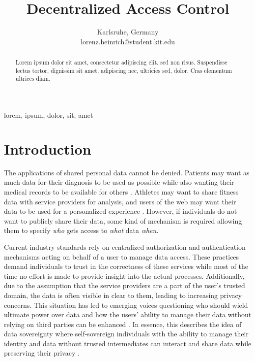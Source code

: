 \documentclass[conference]{IEEEtran}
\begin{document}
\title{Decentralized Access Control}%

\author{
  Karlsruhe, Germany \\
  lorenz.heinrich@student.kit.edu
}

\maketitle

\begin{abstract}
  Lorem ipsum dolor sit amet, consectetur adipiscing elit. sed non risus. Suspendisse lectus tortor, dignissim sit amet, adipiscing nec, ultricies sed, dolor. Cras elementum ultrices diam.
\end{abstract}

\begin{IEEEkeywords}
  lorem, ipsum, dolor, sit, amet
\end{IEEEkeywords}

\section{Introduction}
The applications of shared personal data cannot be denied.
Patients may want as much data for their diagnosis to be used as possible while also wanting their medical records to be available for others \cite{hollis_share_2016}.
Athletes may want to share fitness data with service providers for analysis, and users of the web may want their data to be used for a personalized experience \cite{nasir_council_nodate}.
However, if individuals do not want to publicly share their data, some kind of mechanism is required allowing them to specify \textit{who} gets access to \textit{what} data \textit{when}.

Current industry standards rely on centralized authorization and authentication mechanisms acting on behalf of a user to manage data access. \cite{hardt_oauth_2012,noauthor_googles_nodate}
These practices demand individuals to trust in the correctness of these services while most of the time no effort is made to provide insight into the actual processes.
Additionally, due to the assumption that the service providers are a part of the user's trusted domain, the data is often visible in clear to them, leading to increasing privacy concerns.
This situation has led to emerging voices questioning who should wield ultimate power over data and how the users' ability to manage their data without relying on third parties can be enhanced \cite{noauthor_w3f_nodate}.
In essence, this describes the idea of data sovereignty where self-sovereign individuals with the ability to manage their identity and data without trusted intermediates can interact and share data while preserving their privacy \cite{ernstberger_sok_2023}.
\end{document}
